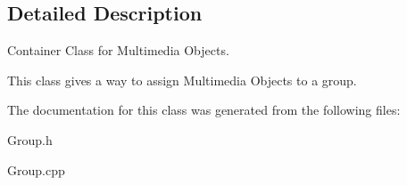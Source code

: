 \subsection{Detailed Description}
Container Class for Multimedia Objects. 

This class gives a way to assign Multimedia Objects to a group. 

The documentation for this class was generated from the following files\-:\begin{DoxyCompactItemize}
\item 
Group.\-h\item 
Group.\-cpp\end{DoxyCompactItemize}
